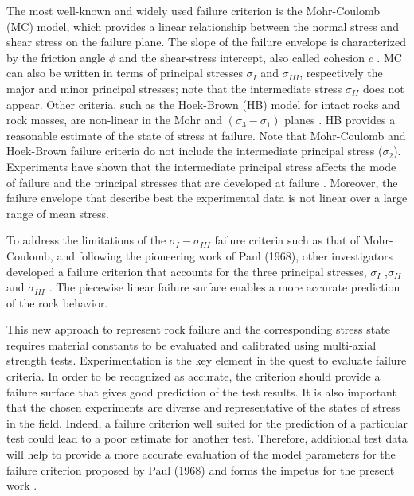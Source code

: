 The most well-known and widely used failure criterion is the Mohr-Coulomb (MC) model, which provides a linear relationship between the normal stress and shear stress on the failure plane. The slope of the failure envelope is characterized by the friction angle $\phi$ and the shear-stress intercept, also called cohesion $c$ \cite{Jaeger1979}. MC can also be written in terms of principal stresses $\sigma_I$ and $\sigma_{III}$, respectively the major and minor principal stresses; note that the intermediate stress $\sigma_{II}$ does not appear. Other criteria, such as the Hoek-Brown (HB) model for intact rocks and rock masses, are non-linear in the Mohr and $(\sigma_{3}-\sigma_{1})$ planes \cite{Hoek1980}. HB provides a reasonable estimate of the state of stress at failure. Note that Mohr-Coulomb and Hoek-Brown failure criteria do not include the intermediate principal stress ($\sigma_2$). Experiments have shown that the intermediate principal stress affects the mode of failure and the principal stresses that are developed at failure \cite{Labuz2018,Labuz1996, Zeng2019,Makhnenko2013}. Moreover, the failure envelope that describe best the experimental data is not linear over a large range of mean stress. 

To address the limitations of the $\sigma_I-\sigma_{III}$ failure criteria such as that of Mohr-Coulomb, and following the pioneering work of Paul (1968), other investigators developed a failure criterion that accounts for the three principal stresses, $\sigma_I$ ,$\sigma_{II}$ and $\sigma_{III}$ \cite{Paul1968,Meyer2013}. The piecewise linear failure surface enables a more accurate prediction of the rock behavior. 

This new approach to represent rock failure and the corresponding stress state requires material constants to be evaluated and calibrated using multi-axial strength tests. Experimentation is the key element in the quest to evaluate failure criteria. In order to be recognized as accurate, the criterion should provide a failure surface that gives good prediction of the test results. It is also important that the chosen experiments are diverse and representative of the states of stress in the field. Indeed, a failure criterion well suited for the prediction of a particular test could lead to a poor estimate for another test. Therefore, additional test data will help to provide a more accurate evaluation of the model parameters for the failure criterion proposed by Paul (1968) and forms the impetus for the present work \cite{Paul1968}.

